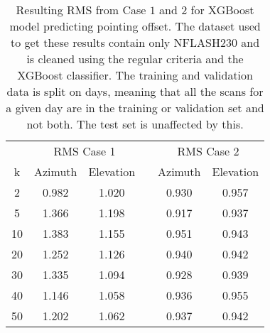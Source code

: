 \begin{table}[h]
    \centering %
    \caption{Resulting RMS from Case $1$ and $2$ for XGBoost model predicting pointing offset.
    The dataset used to get these results contain only NFLASH230 and is cleaned using the regular criteria and the XGBoost classifier.
    The training and validation data is split on days, meaning that all the scans for a given day
    are in the training or validation set and not both. The test set is unaffected by this.}
    \begin{tabular}{ccc c cc}
        \toprule
        \multicolumn{1}{c}{} & \multicolumn{2}{c}{RMS Case 1} & & \multicolumn{2}{c}{RMS Case 2} \\
        \cmidrule(lr){2-3} \cmidrule(lr){5-6}
         k & Azimuth & Elevation & & Azimuth & Elevation \\
        \midrule
        2 &  0.982 &  1.020 & &  0.930 &  0.957 \\
        5 &  1.366 &  1.198 & &  0.917 &  0.937 \\
       10 &  1.383 &  1.155 & &  0.951 &  0.943 \\
       20 &  1.252 &  1.126 & &  0.940 &  0.942 \\
       30 &  1.335 &  1.094 & &  0.928 &  0.939 \\
       40 &  1.146 &  1.058 & &  0.936 &  0.955 \\
       50 &  1.202 &  1.062 & &  0.937 &  0.942 \\
        \bottomrule
    \end{tabular}
    \label{tab:results_nflash_days}
\end{table}